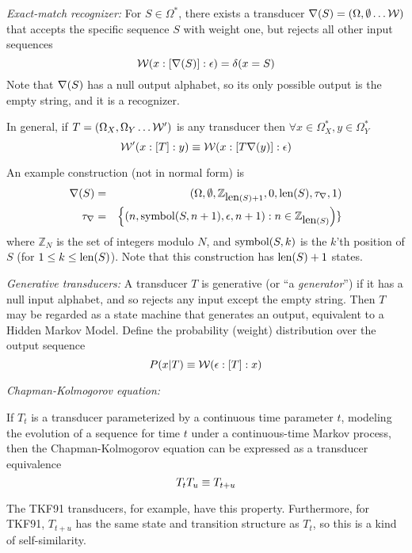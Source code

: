 \documentclass{beamer}
\begin{document}
\begin{frame}{}

{\em Exact-match recognizer:}
For $S \in \Omega^\ast$, there exists a transducer $\nabla(S) = (\Omega,\emptyset\ldots {\cal W})$
that accepts the specific sequence $S$ with weight one, but rejects all other input sequences
\[
{\cal W}(x : [\nabla(S)] : \epsilon) = \delta(x=S)
\]
Note that $\nabla(S)$ has a null output alphabet, so its only possible output is the empty string, and it is a recognizer.

In general, if $T=(\Omega_X,\Omega_Y \ldots {\cal W}')$ is any transducer then $\forall x \in \Omega_X^\ast, y \in \Omega_Y^\ast$
\[
{\cal W}'(x : [T] : y) \equiv {\cal W}(x : [T  \nabla(y)] : \epsilon)
\]

\end{frame}

\begin{frame}{}

An example construction (not in normal form) is
\begin{eqnarray*}
\nabla(S) & = & (\Omega,\emptyset,\mathbb{Z}_{\mbox{len}(S)+1},0,\mbox{len}(S),\tau_{\nabla},1) \\
\tau_{\nabla} & = & \left\{\left(n,\mbox{symbol}(S,n+1),\epsilon,n+1\right):n \in \mathbb{Z}_{\mbox{len}(S)}\right)\}
\end{eqnarray*}
where $\mathbb{Z}_N$ is the set of integers modulo $N$,
 and $\mbox{symbol}(S,k)$ is the $k$'th position of $S$ (for $1 \leq k \leq \mbox{len}(S)$).
Note that this construction has $\mbox{len}(S)+1$ states.

\end{frame}

\begin{frame}{}

{\em Generative transducers:}
A transducer $T$ is generative (or ``a {\em generator}'') if it has a null input alphabet, and so rejects any input except the empty string.
Then $T$ may be regarded as a state machine that generates an output, equivalent to a Hidden Markov Model.
Define the probability (weight) distribution over the output sequence
\[
P(x|T) \equiv {\cal W}(\epsilon : [T] : x)
\]

\end{frame}

\begin{frame}{}

{\em Chapman-Kolmogorov equation:}

If $T_t$ is a transducer parameterized by a continuous time parameter $t$,
modeling the evolution of a sequence for time $t$ under a continuous-time Markov process,
then the Chapman-Kolmogorov equation can be expressed as a transducer equivalence
\[
T_t  T_u \equiv T_{t+u}
\]

The TKF91 transducers, for example, have this property.
Furthermore, for TKF91, $T_{t+u}$ has the same state and transition structure as $T_t$,
so this is a kind of self-similarity.

\end{frame}
\end{document}
